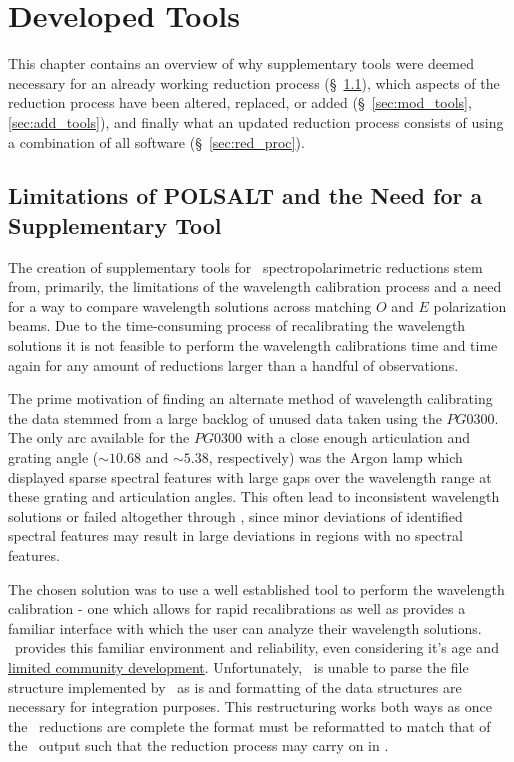 \chapter{Developed Tools}

This chapter contains an overview of why supplementary tools were deemed necessary for an already working reduction process (\S~\ref{sec:polsalt_limits}), which aspects of the reduction process have been altered, replaced, or added (\S~\ref{sec:mod_tools}, \ref{sec:add_tools}), and finally what an updated reduction process consists of using a combination of all software (\S~\ref{sec:red_proc}).


\section{Limitations of POLSALT and the Need for a Supplementary Tool} \label{sec:polsalt_limits} %

The creation of supplementary tools for \polsalt\ spectropolarimetric reductions stem from, primarily, the limitations of the wavelength calibration process and a need for a way to compare wavelength solutions across matching $O$ and $E$ polarization beams. Due to the time-consuming process of recalibrating the wavelength solutions it is not feasible to perform the wavelength calibrations time and time again for any amount of reductions larger than a handful of observations.
\prgph

The prime motivation of finding an alternate method of wavelength calibrating the data stemmed from a large backlog of unused data taken using the $PG0300$. The only arc available for the $PG0300$ with a close enough articulation and grating angle ($\sim 10.68$ and $\sim 5.38$, respectively) was the Argon lamp which displayed sparse spectral features with large gaps over the wavelength range at these grating and articulation angles. This often lead to inconsistent wavelength solutions or failed altogether through \polsalt, since minor deviations of identified spectral features may result in large deviations in regions with no spectral features.
\prgph

The chosen solution was to use a well established tool to perform the wavelength calibration - one which allows for rapid recalibrations as well as provides a familiar interface with which the user can analyze their wavelength solutions. \iraf\ provides this familiar environment and reliability, even considering it's age and \hyperlink{https://github.com/iraf-community/iraf}{limited community development}. Unfortunately, \iraf\ is unable to parse the file structure implemented by \polsalt\ as is and formatting of the data structures are necessary for integration purposes. This restructuring works both ways as once the \iraf\ reductions are complete the format must be reformatted to match that of the \polsalt\ output such that the reduction process may carry on in \polsalt.
\prgph

